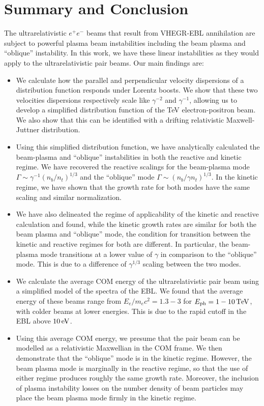 \documentclass[usenatbib,iop,apj,numberedappendix]{aeb_emulateapj_2010}
\def\eV{{\rm eV}} %
\def\TeV{{\rm T}\eV} %
\newcommand{\epm}{\ensuremath{e^+e^-}}
\begin{document}
\section{Summary and Conclusion}\label{sec:conclusions}

The ultrarelativistic $\epm$ beams that result from VHEGR-EBL annihilation are subject to powerful plasma beam instabilities including the beam plasma and ``oblique'' instability.  In this work, we have these linear instabilities as they would apply to the ultrarelativistic pair beams.  Our main findings are:
\begin{itemize}
\item{We calculate how the parallel and perpendicular velocity dispersions of a distribution function responds under Lorentz boosts.  We show that these two velocities dispersions respectively scale like $\gamma^{-2}$ and $\gamma^{-1}$, allowing us to develop a simplified distribution function of the TeV electron-positron beam. We also show that this can be identified with a drifting relativistic Maxwell-Juttner distribution. }
\item{Using this simplified distribution function, we have analytically calculated the beam-plasma and ``oblique'' instabilities in both the reactive and kinetic regime.  We have recovered the reactive scalings for the beam-plasma mode $\Gamma \sim \gamma^{-1}(n_b/n_t)^{1/3}$ and the ``oblique'' mode $\Gamma \sim (n_b/\gamma n_t)^{1/3}$.  In the kinetic regime, we have shown that the growth rate for both modes have the same scaling and similar normalization.}
\item{We have also delineated the regime of applicability of the kinetic and reactive calculation and found, while the kinetic growth rates are similar for both the beam plasma and ``oblique'' mode, the condition for transition between the kinetic and reactive regimes for both are different.  In particular, the beam-plasma mode transitions at a lower value of $\gamma$ in comparison to the ``oblique'' mode.  This is due to a difference of $\gamma^{1/3}$ scaling between the two modes.}
\item{We calculate the average COM energy of the ultrarelativistic pair beam using a simplified model of the spectra of the EBL.  We found that the average energy of these beams range from $E_e/m_e c^2 = 1.3-3$ for $E_{\rm ph} = 1-10\,\TeV$, with colder beams at lower energies.  This is due to the rapid cutoff in the EBL above $10\,\eV$. }
\item{Using this average COM energy, we presume that the pair beam can be modelled as a relativistic Maxwellian in the COM frame.   We then demonstrate that the ``oblique'' mode is in the kinetic regime. However, the beam plasma mode is marginally in the reactive regime, so that the use of either regime produces roughly the same growth rate.  Moreover, the inclusion of plasma instability losses on the number density of beam particles may place the beam plasma mode firmly in the kinetic regime.}
\end{itemize}
\end{document}
